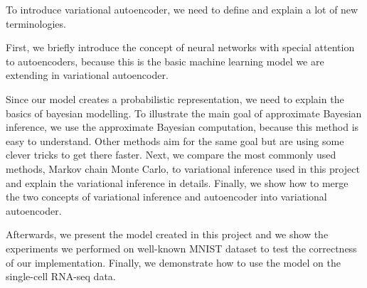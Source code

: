 To introduce variational autoencoder, we need to define and explain a lot of new terminologies.

First, we briefly introduce the concept of neural networks with special attention to autoencoders, because this is the basic machine learning model we are extending in variational autoencoder.

Since our model creates a probabilistic representation, we need to explain the basics of bayesian modelling.
To illustrate the main goal of approximate Bayesian inference, we use the approximate Bayesian computation, because this method is easy to understand.
Other methods aim for the same goal but are using some clever tricks to get there faster.
Next, we compare the most commonly used methods, Markov chain Monte Carlo, to variational inference used in this project and explain the variational inference in details.
Finally, we show how to merge the two concepts of variational inference and autoencoder into variational autoencoder.

Afterwards, we present the model created in this project and we show the experiments we performed on well-known MNIST dataset \cite{lecun1998gradient} to test the correctness of our implementation.
Finally, we demonstrate how to use the model on the single-cell RNA-seq data.
